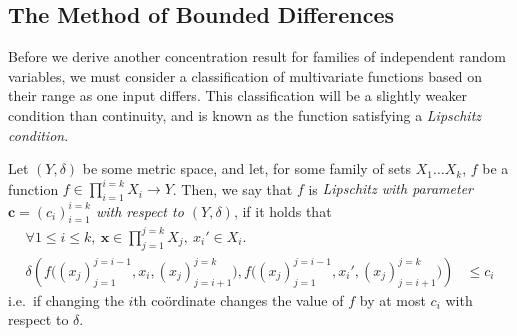 	\subsection{The Method of Bounded Differences}
	Before we derive another concentration result for families of independent random variables,
	we must consider a classification of multivariate functions based on their range as one 
	input differs. This classification will be a slightly weaker condition than continuity, 
	and is known as the function satisfying a \emph{Lipschitz condition}.
	\begin{definition}
		Let $(Y, \delta)$ be some metric space, and let, for some family of sets $X_1\hdots 
		X_k$, $f$ be a function $f \in \prod_{i=1}^{i=k} X_i \rightarrow Y$. Then, we say 
		that $f$ is \emph{Lipschitz with parameter $\mathbf{c} = (c_i)_{i=1}^{i=k}$ with 
		respect to $(Y, \delta)$}, if it holds that
		\begin{align*}
		\forall 1 \leq i \leq k ,\ \mathbf{x} \in\prod_{j=1}^{j=k}X_j,\ 
		 x_i' \in X_i . \\
		\delta\left(f\Big((x_j)_{j=1}^{j=i-1}, x_i, (x_j)_{j=i+1}^{j=k}\Big), 
		f\Big((x_j)_{j=1}^{j=i-1}, x_i', (x_j)_{j=i+1}^{j=k}\Big)\right) &\leq c_i
		\end{align*}
		i.e.\ if changing the $i$th co\"ordinate changes the value of $f$ by at most $c_i$
		with respect to $\delta$.
	\end{definition}
	\begin{comment}
		We will usually consider the metric space $(\mathbb{R}, \delta)$, where $\delta$ is
		given by $\delta \coloneqq \lambda x, y. |x-y|$. In this case we omit the mention 
		of which metric space we are really considering. \\
		Furthermore, one commonly sees a related, but still weaker notion of a function 
		being `Lipschitz', under which a $g \in X \rightarrow Y$ is \emph{C-Lipschitz} with
		respect to $(X, \delta_X)$ and $(Y, \delta_Y)$ if $\forall x, x'\in X. 
		\delta_Y(f(x), f(x')) \leq C \cdot \delta_X(x, x')$. We do not consider this notion
		here, though.
	\end{comment}
	
